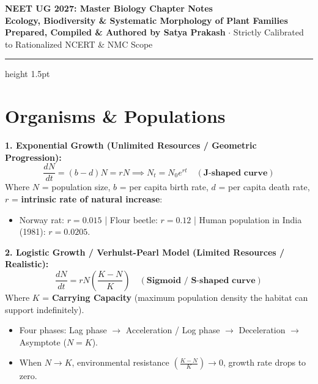 \documentclass[10pt,a4paper]{article}
\begin{document}
\begin{center}
  {\Huge \textbf{NEET UG 2027: Master Biology Chapter Notes}}\\[6pt]
  {\Large \textbf{Ecology, Biodiversity \& Systematic Morphology of Plant Families}}\\[4pt]
  {\small \textbf{Prepared, Compiled \& Authored by Satya Prakash} $\cdot$ Strictly Calibrated to Rationalized NCERT \& NMC Scope}
  \vspace{4pt}
  \hrule height 1.5pt
\end{center}

\pagestyle{fancy}
\fancyhf{}
\fancyfoot[C]{\thepage}

\section{Organisms \& Populations}

\begin{formulabox}
\textbf{1. Exponential Growth (Unlimited Resources / Geometric Progression):}
\begin{equation}
  \frac{dN}{dt} = (b - d)N = rN \implies N_t = N_0 e^{rt} \quad (\textbf{J-shaped curve})
\end{equation}
Where $N$ = population size, $b$ = per capita birth rate, $d$ = per capita death rate, $r$ = \textbf{intrinsic rate of natural increase}:
\begin{itemize}
  \item Norway rat: $r = 0.015$ | Flour beetle: $r = 0.12$ | Human population in India (1981): $r = 0.0205$.
\end{itemize}
\textbf{2. Logistic Growth / Verhulst-Pearl Model (Limited Resources / Realistic):}
\begin{equation}
  \frac{dN}{dt} = rN \left(\frac{K - N}{K}\right) \quad (\textbf{Sigmoid / S-shaped curve})
\end{equation}
Where $K$ = \textbf{Carrying Capacity} (maximum population density the habitat can support indefinitely).
\begin{itemize}
  \item Four phases: Lag phase $\to$ Acceleration / Log phase $\to$ Deceleration $\to$ Asymptote ($N = K$).
  \item When $N \to K$, environmental resistance $\left(\frac{K-N}{K}\right) \to 0$, growth rate drops to zero.
\end{itemize}
\end{formulabox}
\end{document}
